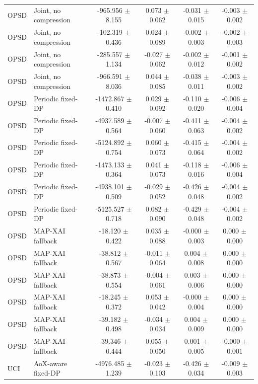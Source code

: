 \begin{table}[t]
\begin{tabular}{llcccc}
OPSD & Joint, no compression & -965.956 $\pm$ 8.155 & 0.073 $\pm$ 0.062 & -0.031 $\pm$ 0.015 & -0.003 $\pm$ 0.002 \\
OPSD & Joint, no compression & -102.319 $\pm$ 0.436 & 0.024 $\pm$ 0.089 & -0.002 $\pm$ 0.003 & -0.002 $\pm$ 0.003 \\
OPSD & Joint, no compression & -285.557 $\pm$ 1.134 & -0.027 $\pm$ 0.062 & -0.002 $\pm$ 0.012 & -0.001 $\pm$ 0.002 \\
OPSD & Joint, no compression & -966.591 $\pm$ 8.036 & 0.044 $\pm$ 0.085 & -0.038 $\pm$ 0.011 & -0.003 $\pm$ 0.002 \\
OPSD & Periodic fixed-DP & -1472.867 $\pm$ 0.410 & 0.029 $\pm$ 0.092 & -0.110 $\pm$ 0.020 & -0.006 $\pm$ 0.004 \\
OPSD & Periodic fixed-DP & -4937.589 $\pm$ 0.564 & -0.007 $\pm$ 0.060 & -0.411 $\pm$ 0.063 & -0.004 $\pm$ 0.002 \\
OPSD & Periodic fixed-DP & -5124.892 $\pm$ 0.754 & 0.060 $\pm$ 0.073 & -0.415 $\pm$ 0.064 & -0.004 $\pm$ 0.002 \\
OPSD & Periodic fixed-DP & -1473.133 $\pm$ 0.364 & 0.041 $\pm$ 0.073 & -0.118 $\pm$ 0.016 & -0.006 $\pm$ 0.004 \\
OPSD & Periodic fixed-DP & -4938.101 $\pm$ 0.509 & -0.029 $\pm$ 0.052 & -0.426 $\pm$ 0.048 & -0.004 $\pm$ 0.002 \\
OPSD & Periodic fixed-DP & -5125.527 $\pm$ 0.718 & 0.082 $\pm$ 0.090 & -0.429 $\pm$ 0.048 & -0.004 $\pm$ 0.002 \\
OPSD & MAP-XAI fallback & -18.120 $\pm$ 0.422 & 0.035 $\pm$ 0.088 & -0.000 $\pm$ 0.003 & 0.000 $\pm$ 0.000 \\
OPSD & MAP-XAI fallback & -38.812 $\pm$ 0.567 & -0.011 $\pm$ 0.064 & 0.004 $\pm$ 0.008 & 0.000 $\pm$ 0.000 \\
OPSD & MAP-XAI fallback & -38.873 $\pm$ 0.554 & -0.004 $\pm$ 0.061 & 0.003 $\pm$ 0.006 & 0.000 $\pm$ 0.000 \\
OPSD & MAP-XAI fallback & -18.245 $\pm$ 0.372 & 0.053 $\pm$ 0.042 & -0.000 $\pm$ 0.004 & 0.000 $\pm$ 0.000 \\
OPSD & MAP-XAI fallback & -39.182 $\pm$ 0.498 & -0.034 $\pm$ 0.034 & 0.004 $\pm$ 0.009 & 0.000 $\pm$ 0.000 \\
OPSD & MAP-XAI fallback & -39.346 $\pm$ 0.444 & 0.055 $\pm$ 0.050 & 0.001 $\pm$ 0.005 & -0.000 $\pm$ 0.001 \\
UCI & AoX-aware fixed-DP & -4976.485 $\pm$ 1.239 & -0.023 $\pm$ 0.103 & -0.426 $\pm$ 0.034 & -0.009 $\pm$ 0.003 \\

\end{tabular}
\end{table}

